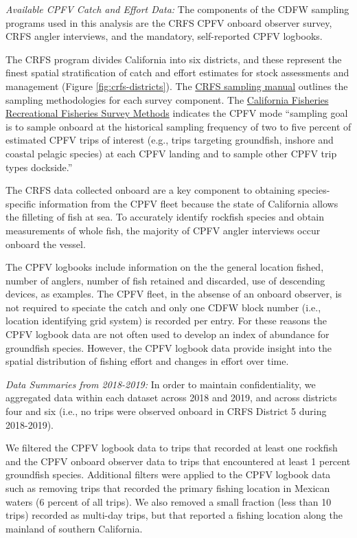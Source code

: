 \documentclass[11pt,
  english,
  letterpaper,
]{article}
\begin{document}
\emph{Available CPFV Catch and Effort Data:} The components of the CDFW sampling programs used in this analysis are the CRFS CPFV onboard observer survey, CRFS angler interviews, and the mandatory, self-reported CPFV logbooks.

The CRFS program divides California into six districts, and these represent the finest spatial stratification of catch and effort estimates for stock assessments and management (Figure \ref{fig:crfs-districts}). The \href{https://nrm.dfg.ca.gov/FileHandler.ashx?DocumentID=62348\&inline}{CRFS sampling manual} outlines the sampling methodologies for each survey component. The \href{https://nrm.dfg.ca.gov/FileHandler.ashx?DocumentID=36136\&inline}{California Fisheries Recreational Fisheries Survey Methods} indicates the CPFV mode ``sampling goal is to sample onboard at the historical sampling frequency of two to five percent of estimated CPFV trips of interest (e.g., trips targeting groundfish, inshore and coastal pelagic species) at each CPFV landing and to sample other CPFV trip types dockside.''

The CRFS data collected onboard are a key component to obtaining species-specific information from the CPFV fleet because the state of California allows the filleting of fish at sea. To accurately identify rockfish species and obtain measurements of whole fish, the majority of CPFV angler interviews occur onboard the vessel.

The CPFV logbooks include information on the the general location fished, number of anglers, number of fish retained and discarded, use of descending devices, as examples. The CPFV fleet, in the absense of an onboard observer, is not required to speciate the catch and only one CDFW block number (i.e., location identifying grid system) is recorded per entry. For these reasons the CPFV logbook data are not often used to develop an index of abundance for groundfish species. However, the CPFV logbook data provide insight into the spatial distribution of fishing effort and changes in effort over time.

\emph{Data Summaries from 2018-2019:} In order to maintain confidentiality, we aggregated data within each dataset across 2018 and 2019, and across districts four and six (i.e., no trips were observed onboard in CRFS District 5 during 2018-2019).

We filtered the CPFV logbook data to trips that recorded at least one rockfish and the CPFV onboard observer data to trips that encountered at least 1 percent groundfish species. Additional filters were applied to the CPFV logbook data such as removing trips that recorded the primary fishing location in Mexican waters (6 percent of all trips). We also removed a small fraction (less than 10 trips) recorded as multi-day trips, but that reported a fishing location along the mainland of southern California.
\end{document}
